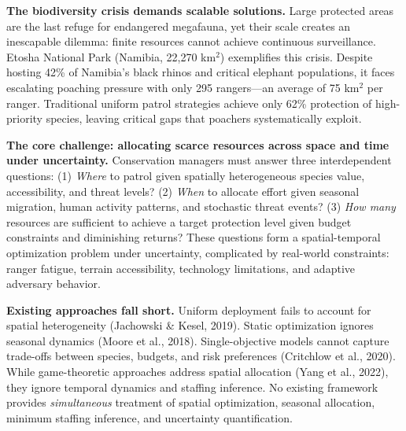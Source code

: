 
\textbf{The biodiversity crisis demands scalable solutions.}
Large protected areas are the last refuge for endangered megafauna, yet their scale creates an inescapable dilemma: finite resources cannot achieve continuous surveillance. Etosha National Park (Namibia, 22,270 km$^2$) exemplifies this crisis. Despite hosting 42\% of Namibia's black rhinos and critical elephant populations, it faces escalating poaching pressure with only 295 rangers---an average of 75 km$^2$ per ranger. Traditional uniform patrol strategies achieve only 62\% protection of high-priority species, leaving critical gaps that poachers systematically exploit.

\vspace{0.3cm}

\textbf{The core challenge: allocating scarce resources across space and time under uncertainty.}
Conservation managers must answer three interdependent questions: (1) \emph{Where} to patrol given spatially heterogeneous species value, accessibility, and threat levels? (2) \emph{When} to allocate effort given seasonal migration, human activity patterns, and stochastic threat events? (3) \emph{How many} resources are sufficient to achieve a target protection level given budget constraints and diminishing returns? These questions form a spatial-temporal optimization problem under uncertainty, complicated by real-world constraints: ranger fatigue, terrain accessibility, technology limitations, and adaptive adversary behavior.

\vspace{0.3cm}

\textbf{Existing approaches fall short.}
Uniform deployment fails to account for spatial heterogeneity (Jachowski \& Kesel, 2019). Static optimization ignores seasonal dynamics (Moore et al., 2018). Single-objective models cannot capture trade-offs between species, budgets, and risk preferences (Critchlow et al., 2020). While game-theoretic approaches address spatial allocation (Yang et al., 2022), they ignore temporal dynamics and staffing inference. No existing framework provides \emph{simultaneous} treatment of spatial optimization, seasonal allocation, minimum staffing inference, and uncertainty quantification.

